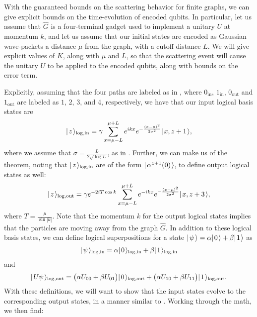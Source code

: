 \documentclass[../thesis-main/thesis-main]{subfiles}
\begin{document}
With the guaranteed bounds on the scattering behavior for finite graphs, we can give explicit bounds on the time-evolution of encoded qubits.  In particular, let us assume that $\widehat{G}$ is a four-terminal gadget used to implement a unitary $U$ at momentum $k$, and let us assume that our initial states are encoded as Gaussian wave-packets a distance $\mu$ from the graph, with a cutoff distance $L$.  We will give explicit values of $K$, along with $\mu$ and $L$, so that the scattering event will cause the unitary $U$ to be applied to the encoded qubits, along with bounds on the error term.




Explicitly, assuming that the four paths are labeled as in , where $0_\text{in}$, $1_{\text{in}}$, $0_{\text{out}}$ and $1_{\text{out}}$ are labeled as $1$, $2$, $3$, and $4$, respectively, we have that our input logical basis states are
\begin{align}
  |\mspace{2mu} z \mspace{2mu} \rangle_{\text{log},\text{in}} = \gamma \sum_{x = \mu - L}^{\mu + L} e^{ i k x} e^{ - \frac{(x-\mu)^2}{2\sigma^2}} |\mspace{2mu} x,z+1 \mspace{2mu} \rangle,
  \label{eq:single_qubit_input_encoding}
\end{align}
where we assume that $\sigma = \frac{L}{2\sqrt{\log L}}$, as in .  Further, we can make us of the theorem, noting that $|\mspace{2mu} z \mspace{2mu} \rangle_{\text{log},\text{in}}$ are of the form $|\mspace{2mu} \alpha^{z+1}(0) \mspace{2mu} \rangle$, to define output logical states as well:
 \begin{align}
  |\mspace{2mu} z \mspace{2mu} \rangle_{\text{log},\text{out}} = \gamma e^{- 2 i T \cos k} \sum_{x = \mu - L}^{\mu + L} e^{ -i k x} e^{ - \frac{(x-\mu)^2}{2\sigma^2}} |\mspace{2mu} x,z+3 \mspace{2mu} \rangle,
  \label{eq:single_qubit_output_encoding}
\end{align}
where $T = \frac{\mu}{\sin |k|}$.  Note that the momentum $k$ for the output logical states implies that the particles are moving away from the graph $\widehat{G}$.  In addition to these logical basis states, we can define logical superpositions for a state $|\mspace{2mu} \psi \mspace{2mu} \rangle = \alpha |\mspace{2mu} 0 \mspace{2mu} \rangle + \beta|\mspace{2mu} 1 \mspace{2mu} \rangle$ as
\begin{align}
  |\mspace{2mu} \psi \mspace{2mu} \rangle_{\text{log},\text{in}} = \alpha |\mspace{2mu} 0 \mspace{2mu} \rangle_{\text{log},\text{in}} + \beta |\mspace{2mu} 1 \mspace{2mu} \rangle_{\text{log},\text{in}}
\end{align} 
and
\begin{align}
  |\mspace{2mu} U \psi \mspace{2mu} \rangle_{\text{log},\text{out}} = \big(\alpha U_{00} + \beta U_{01} \big) |\mspace{2mu} 0 \mspace{2mu} \rangle_{\text{log},\text{out}} + \big(\alpha U_{10} + \beta U_{11} \big)|\mspace{2mu} 1 \mspace{2mu} \rangle_{\text{log},\text{out}}.
\end{align}
With these definitions, we will want to show that the input states evolve to the corresponding output states, in a manner similar to .  Working through the math, we then find:
\end{document}
